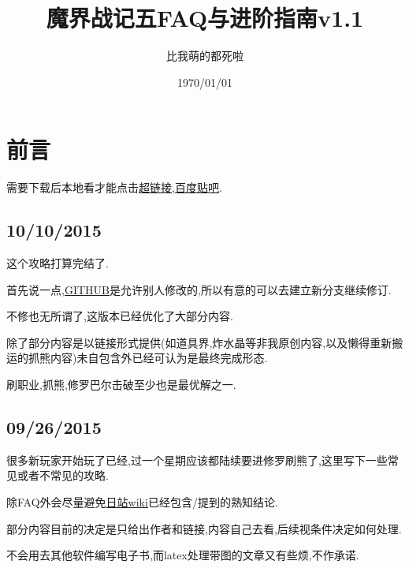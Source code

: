 




\title{魔界战记五FAQ与进阶指南v1.1}
\author{比我萌的都死啦}
\date{1970/01/01}

\maketitle

\newpage

\section{前言}

需要下载后本地看才能点击\href{https://github.com/KindleIsNotKind/Disgaea_5_How_To}{超链接},\href{http://tieba.baidu.com/f?kw=%E9%AD%94%E7%95%8C%E6%88%98%E8%AE%B0&ie=utf-8}{百度贴吧}.

\subsection{10/10/2015}


这个攻略打算完结了.

首先说一点,\href{https://github.com/KindleIsNotKind/Disgaea_5_How_To}{GITHUB}是允许别人修改的,所以有意的可以去建立新分支继续修订.

不修也无所谓了,这版本已经优化了大部分内容.

除了部分内容是以链接形式提供(如道具界,炸水晶等非我原创内容,以及懒得重新搬运的抓熊内容)未自包含外已经可认为是最终完成形态.

刷职业,抓熊,修罗巴尔击破至少也是最优解之一.

\subsection{09/26/2015}

很多新玩家开始玩了已经,过一个星期应该都陆续要进修罗刷熊了,这里写下一些常见或者不常见的攻略.

{\color{red}{本文建立在有魔女DLC和暴君DLC的基础之上,几十块钱和几十小时时间自己选.}}

除FAQ外会尽量避免\href{http://wikinavi.net/disgaea5/index.php}{日站wiki}已经包含/提到的熟知结论.

部分内容目前的决定是只给出作者和链接,内容自己去看,后续视条件决定如何处理.

不会用去其他软件编写电子书,而latex处理带图的文章又有些烦,不作承诺.

